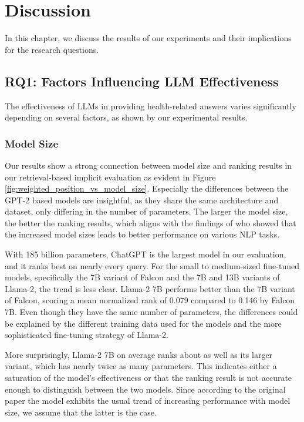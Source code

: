 
\chapter{Discussion}\label{discussion}

In this chapter, we discuss the results of our experiments and their implications for the research questions. 

\section{RQ1: Factors Influencing LLM Effectiveness}

The effectiveness of LLMs in providing health-related answers varies significantly depending on several factors, as shown by our experimental results.

\subsection{Model Size}
Our results show a strong connection between model size and ranking results in our retrieval-based implicit evaluation as evident in Figure \ref{fig:weighted_position_vs_model_size}. 
Especially the differences between the GPT-2 based models are insightful, as they share the same architecture and dataset, only differing in the number of parameters.
The larger the model size, the better the ranking results, which aligns with the findings of \cite{radford:2019:language} who showed that the increased model sizes leads to better performance on various NLP tasks.

With 185 billion parameters, ChatGPT is the largest model in our evaluation, and it ranks best on nearly every query.
For the small to medium-sized fine-tuned models, specifically the 7B variant of Falcon and the 7B and 13B variants of Llama-2, the trend is less clear.
Llama-2 7B performs better than the 7B variant of Falcon, scoring a mean normalized rank of 0.079 compared to 0.146 by Falcon 7B.
Even though they have the same number of parameters, the differences could be explained by the different training data used for the models and the more sophisticated fine-tuning strategy of Llama-2.

More surprisingly, Llama-2 7B on average ranks about as well as its larger variant, which has nearly twice as many parameters.
This indicates either a saturation of the model's effectiveness or that the ranking result is not accurate enough to distinguish between the two models.
Since according to the original paper \cite{touvron:2023:Llama} the model exhibits the usual trend of increasing performance with model size, we assume that the latter is the case.

